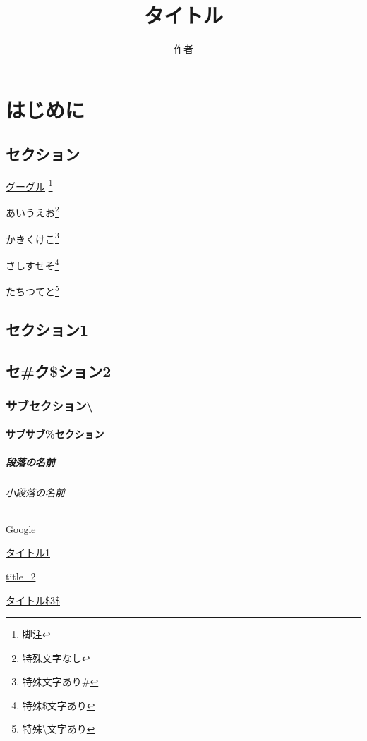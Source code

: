 \documentclass[uplatex, oneside]{jsbook}
\title{タイトル}
\author{作者}
\begin{document}
\maketitle
\tableofcontents

\chapter{はじめに}

\section{セクション}

\href{http://www.google.co.jp}{グーグル}
\footnote{脚注}

\newpage

あいうえお\footnote{特殊文字なし}

かきくけこ\footnote{特殊文字あり\#}

さしすせそ\footnote{特殊\$文字あり}

たちつてと\footnote{特殊\textbackslash 文字あり}

\newpage

\section{セクション1}

\section{セ\#ク\$ション2}

\subsection{サブセクション\textbackslash}

\subsubsection{サブサブ\%セクション}

\paragraph{段落の名前}

\subparagraph{小段落の名前}

\newpage

\href{http://www.google.co.jp}{Google}

\href{http://localhost:3000/sample/page1}{タイトル1}

\href{http://localhost:3000/sample/page2}{title\_2}

\href{http://localhost:3000/sample/page3}{タイトル\$3\$}
\end{document}
